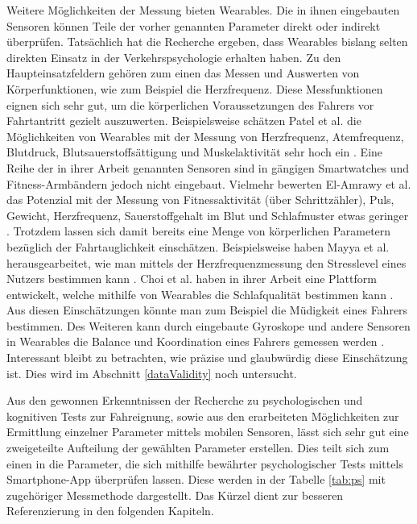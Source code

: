 Weitere Möglichkeiten der Messung bieten Wearables. Die in ihnen eingebauten Sensoren können Teile der vorher genannten Parameter direkt oder indirekt überprüfen. Tatsächlich hat die Recherche ergeben, dass Wearables bislang selten direkten Einsatz in der Verkehrspsychologie erhalten haben. Zu den Haupteinsatzfeldern gehören zum einen das Messen und Auswerten von Körperfunktionen, wie zum Beispiel die Herzfrequenz. Diese Messfunktionen eignen sich sehr gut, um die körperlichen Voraussetzungen des Fahrers vor Fahrtantritt gezielt auszuwerten. Beispielsweise schätzen Patel et al. die Möglichkeiten von Wearables mit der Messung von Herzfrequenz, Atemfrequenz, Blutdruck, Blutsauerstoffsättigung und Muskelaktivität sehr hoch ein \cite{reviewwearablesensors}. Eine Reihe der in ihrer Arbeit genannten Sensoren sind in gängigen Smartwatches und Fitness-Armbändern jedoch nicht eingebaut. Vielmehr bewerten  El-Amrawy et al. das Potenzial mit der Messung von Fitnessaktivität (über Schrittzähler), Puls, Gewicht, Herzfrequenz, Sauerstoffgehalt im Blut und Schlafmuster etwas geringer \cite{wearabletracking}. Trotzdem lassen sich damit bereits eine Menge von körperlichen Parametern bezüglich der Fahrtauglichkeit einschätzen. Beispielsweise haben Mayya et al. herausgearbeitet, wie man mittels der Herzfrequenzmessung den Stresslevel eines Nutzers bestimmen kann \cite{monitoringstressheartrate}. Choi et al. haben in ihrer Arbeit eine Plattform entwickelt, welche mithilfe von Wearables die Schlafqualität bestimmen kann \cite{platformsleepquality}. Aus diesen Einschätzungen könnte man zum Beispiel die Müdigkeit eines Fahrers bestimmen.  Des Weiteren kann durch eingebaute Gyroskope und andere Sensoren in Wearables die Balance und Koordination eines Fahrers gemessen werden \cite{balancewearables, smartglasses}.  Interessant bleibt zu betrachten, wie präzise und glaubwürdig diese Einschätzung ist. Dies wird im Abschnitt \ref{dataValidity} noch untersucht.

Aus den gewonnen Erkenntnissen der Recherche zu psychologischen und kognitiven Tests zur Fahreignung, sowie aus den erarbeiteten Möglichkeiten zur Ermittlung einzelner Parameter mittels mobilen Sensoren, lässt sich sehr gut eine zweigeteilte Aufteilung der gewählten Parameter erstellen. Dies teilt sich zum einen in die Parameter, die sich mithilfe bewährter psychologischer Tests mittels Smartphone-App überprüfen lassen. Diese werden in der Tabelle \ref{tab:ps} mit zugehöriger Messmethode dargestellt. Das Kürzel dient zur besseren Referenzierung in den folgenden Kapiteln. 

